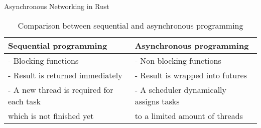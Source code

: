 \begin{frame}{Asynchronous Networking in Rust}
    \begin{table}
        \begin{tabular}{l l}
            \toprule
            \textbf{Sequential programming}          & \textbf{Asynchronous programming}       \\
            \midrule
            - Blocking functions                     & - Non blocking functions                \\
            - Result is returned immediately         & - Result is wrapped into futures        \\
            - A new thread is required for each task & - A scheduler dynamically assigns tasks \\
            which is not finished yet                & to a limited amount of threads          \\
            \bottomrule
        \end{tabular}
        \caption{Comparison between sequential and asynchronous programming}
    \end{table}

\end{frame}
